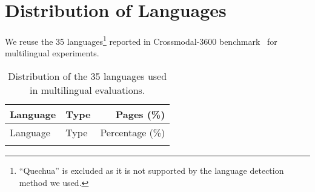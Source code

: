 \section{Distribution of Languages}
\label{appendix:lang_distribution}

We reuse the 35 languages\footnote{``Quechua'' is excluded as it is not supported by the language detection method we used.} reported in Crossmodal-3600 benchmark~\citep{thapliyal2022crossmodal} for multilingual experiments.

{\footnotesize

\begin{longtable}{l|l|r}
\caption{Distribution of the 35 languages used in multilingual evaluations.}
\label{tab:lang_distribution} \\

\toprule
Language & Type & Pages (\%) \\
\midrule
\endfirsthead  %

\toprule
Language & Type & Percentage (\%) \\
\midrule
\endhead  %

\bottomrule
\endfoot  %

\bottomrule
\endlastfoot %


\end{longtable}}

